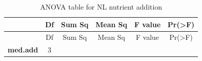 \documentclass[]{article}
\begin{document}
\begin{longtable}[]{@{}cccccc@{}}
\caption{ANOVA table for NL nutrient addition}\tabularnewline
\toprule
\begin{minipage}[b]{0.19\columnwidth}\centering\strut
~
\strut\end{minipage} &
\begin{minipage}[b]{0.06\columnwidth}\centering\strut
Df
\strut\end{minipage} &
\begin{minipage}[b]{0.10\columnwidth}\centering\strut
Sum Sq
\strut\end{minipage} &
\begin{minipage}[b]{0.12\columnwidth}\centering\strut
Mean Sq
\strut\end{minipage} &
\begin{minipage}[b]{0.12\columnwidth}\centering\strut
F value
\strut\end{minipage} &
\begin{minipage}[b]{0.12\columnwidth}\centering\strut
Pr(\textgreater{}F)
\strut\end{minipage}\tabularnewline
\midrule
\endfirsthead
\toprule
\begin{minipage}[b]{0.19\columnwidth}\centering\strut
~
\strut\end{minipage} &
\begin{minipage}[b]{0.06\columnwidth}\centering\strut
Df
\strut\end{minipage} &
\begin{minipage}[b]{0.10\columnwidth}\centering\strut
Sum Sq
\strut\end{minipage} &
\begin{minipage}[b]{0.12\columnwidth}\centering\strut
Mean Sq
\strut\end{minipage} &
\begin{minipage}[b]{0.12\columnwidth}\centering\strut
F value
\strut\end{minipage} &
\begin{minipage}[b]{0.12\columnwidth}\centering\strut
Pr(\textgreater{}F)
\strut\end{minipage}\tabularnewline
\midrule
\endhead
\begin{minipage}[t]{0.19\columnwidth}\centering\strut
\textbf{med.add}
\strut\end{minipage} &
\begin{minipage}[t]{0.06\columnwidth}\centering\strut
3
\strut\end{minipage} &
\begin{minipage}[t]{0.10\columnwidth}\centering\strut

\end{minipage}
\end{longtable}
\end{document}
